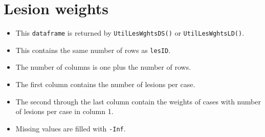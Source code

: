 \documentclass[
]{book}
\providecommand{\tightlist}{%
  \setlength{\itemsep}{0pt}\setlength{\parskip}{0pt}}
\begin{document}
\hypertarget{quick-start-froc-data-lesion-weights}{%
\section{Lesion weights}\label{quick-start-froc-data-lesion-weights}}

\begin{itemize}
\tightlist
\item
  This \texttt{dataframe} is returned by \texttt{UtilLesWghtsDS()} or \texttt{UtilLesWghtsLD()}.
\item
  This contains the same number of rows as \texttt{lesID}.
\item
  The number of columns is one plus the number of rows.
\item
  The first column contains the number of lesions per case.
\item
  The second through the last column contain the weights of cases with number of lesions per case in column 1.
\item
  Missing values are filled with \texttt{-Inf}.
\end{itemize}
\end{document}
